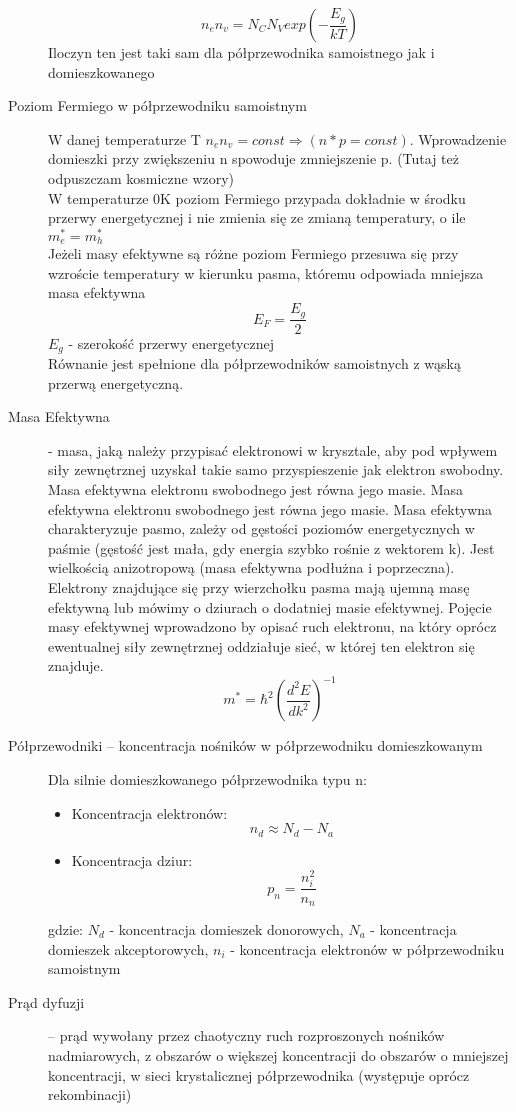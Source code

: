 \documentclass[a4paper,11pt]{article}
\begin{document}
\begin{description}
  $$n_en_v=N_CN_Vexp\left(-\frac{E_g}{kT}\right)$$
  Iloczyn ten jest taki sam dla półprzewodnika samoistnego jak i domieszkowanego
\item[Poziom Fermiego w półprzewodniku samoistnym] W danej temperaturze T $n_en_v=const\Rightarrow(n*p=const)$. Wprowadzenie domieszki przy zwiększeniu n spowoduje zmniejszenie p. (Tutaj też odpuszczam kosmiczne wzory)\\
  W temperaturze 0K poziom Fermiego przypada dokładnie w środku przerwy energetycznej i nie zmienia się ze zmianą temperatury, o ile $m^*_e=m^*_h$\\
  Jeżeli masy efektywne są różne poziom Fermiego przesuwa się przy wzroście temperatury w kierunku pasma, któremu odpowiada mniejsza masa efektywna
  $$E_F=\frac{E_g}{2}$$
  $E_g$ - szerokość przerwy energetycznej\\
  Równanie jest spełnione dla półprzewodników samoistnych z wąską przerwą energetyczną.
\item[Masa Efektywna] - masa, jaką należy przypisać elektronowi w krysztale, aby pod wpływem siły zewnętrznej uzyskał takie samo przyspieszenie jak elektron swobodny. Masa efektywna elektronu swobodnego jest równa jego masie. Masa efektywna elektronu swobodnego jest równa jego masie. Masa efektywna charakteryzuje pasmo, zależy od gęstości poziomów energetycznych w paśmie (gęstość jest mała, gdy energia szybko rośnie z wektorem k). Jest wielkością anizotropową (masa efektywna podłużna i poprzeczna).\\
  Elektrony znajdujące się przy wierzchołku pasma mają ujemną masę efektywną lub mówimy o dziurach o dodatniej masie efektywnej. Pojęcie masy efektywnej wprowadzono by opisać ruch elektronu, na który oprócz ewentualnej siły zewnętrznej oddziałuje sieć, w której ten elektron się znajduje.
  $$m^* =\hbar^2\left(\frac{d^2E}{dk^2}\right)^{-1}$$
\item[Półprzewodniki -- koncentracja nośników w półprzewodniku domieszkowanym] Dla silnie domieszkowanego półprzewodnika typu n:
  \begin{itemize}
  \item Koncentracja elektronów:
    $$n_d\approx N_d-N_a$$
  \item Koncentracja dziur:
    $$p_n=\frac{n^2_i}{n_n}$$
  \end{itemize}
  gdzie: $N_d$ - koncentracja domieszek donorowych, $N_a$ - koncentracja domieszek akceptorowych, $n_i$ - koncentracja elektronów w półprzewodniku samoistnym
\item[Prąd dyfuzji] -- prąd wywołany przez chaotyczny ruch rozproszonych nośników nadmiarowych, z obszarów o większej koncentracji do obszarów o mniejszej koncentracji, w sieci krystalicznej półprzewodnika (występuje oprócz rekombinacji)\\

\end{description}
\end{document}
